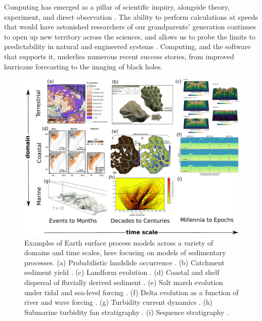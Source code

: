 \documentclass[journal abbreviation, manuscript]{copernicus}
\begin{document}
Computing has emerged as a pillar of scientific inquiry, alongside theory, experiment, and direct observation  \citep{pitac2005computational}. The ability to perform calculations at speeds that would have astonished researchers of our grandparents' generation continues to open up new territory across the sciences, and allows us to probe the limits to predictability in natural and engineered systems \citep{post2005computational,post2013changing}. Computing, and the software that supports it, underlies numerous recent success stories, from improved hurricane forecasting to the imaging of black holes. 

\begin{figure}[h!]
\centering
\includegraphics[width=6in]{Figures/fig01.pdf}
\caption{Examples of Earth surface process models across a variety of domains and time scales, here focusing on models of sedimentary processes. (a) Probabilistic landslide occurrence \citep{strauch2018hydroclimatological}. (b) Catchment sediment yield \citep{carriere2020impact}. (c) Landform evolution \citep{barnhart2019terrainbento}. (d) Coastal and shelf dispersal of fluvially derived sediment \citep{kuehl2016source}. (e) Salt marsh evolution under tidal and sea-level forcing \citep{mariotti2018marsh}. (f) Delta evolution as a function of river and wave forcing \citep{ratliff2018exploring}. (g) Turbidity current dynamics \citep{nasr2013polydisperse}. (h) Submarine turbidity fan stratigraphy \citep{groenenberg2010flow}. (i) Sequence stratigraphy \citep{steckler2019developing}.}
\label{fig:modelexamples}
\end{figure}
\end{document}
